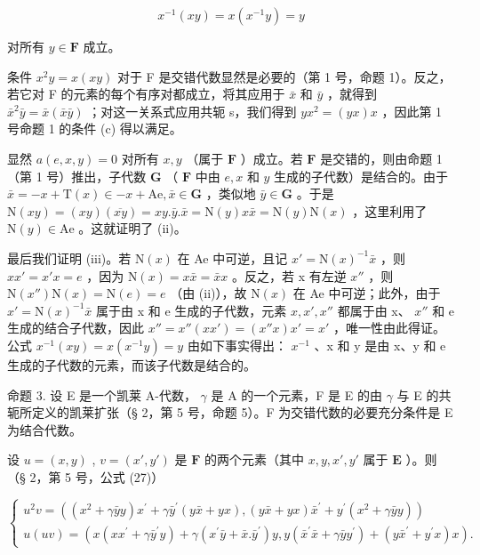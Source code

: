 \[
x ^ {- 1} (x y) = x \left(x ^ {- 1} y\right) = y
\]

对所有 \(y \in \mathbf{F}\) 成立。

条件 \(x^{2}y = x(xy)\) 对于 F 是交错代数显然是必要的（第 1 号，命题 1）。反之，若它对 F 的元素的每个有序对都成立，将其应用于 \(\bar{x}\) 和 \(\bar{y}\) ，就得到 \(\bar{x}^{2}\bar{y} = \bar{x}(\bar{x}\bar{y})\) ；对这一关系式应用共轭 s，我们得到 \(yx^{2} = (yx)x\) ，因此第 1 号命题 1 的条件 (c) 得以满足。

显然 \(a(e, x, y) = 0\) 对所有 \(x, y\) （属于 \(\mathbf{F}\) ）成立。若 \(\mathbf{F}\) 是交错的，则由命题 1（第 1 号）推出，子代数 \(\mathbf{G}\) （ \(\mathbf{F}\) 中由 \(e, x\) 和 \(y\) 生成的子代数）是结合的。由于 \(\bar{x} = -x + \mathrm{T}(x) \in -x + \mathrm{Ae}, \bar{x} \in \mathbf{G}\) ，类似地 \(\bar{y} \in \mathbf{G}\) 。于是 \(\mathrm{N}(xy) = (xy)(\overline{xy}) = xy.\bar{y}.\bar{x} = \mathrm{N}(y)x\bar{x} = \mathrm{N}(y)\mathrm{N}(x)\) ，这里利用了 \(\mathrm{N}(y) \in \mathrm{Ae}\) 。这就证明了 (ii)。

最后我们证明 (iii)。若 \(\mathrm{N}(x)\) 在 Ae 中可逆，且记 \(x' = \mathrm{N}(x)^{-1}\bar{x}\) ，则 \(xx' = x'x = e\) ，因为 \(\mathrm{N}(x) = x\bar{x} = \bar{x}x\) 。反之，若 x 有左逆 \(x''\) ，则 \(\mathrm{N}(x'')\mathrm{N}(x) = \mathrm{N}(e) = e\) （由 (ii)），故 \(\mathrm{N}(x)\) 在 Ae 中可逆；此外，由于 \(x' = \mathrm{N}(x)^{-1}\bar{x}\) 属于由 x 和 e 生成的子代数，元素 \(x, x', x''\) 都属于由 x、 \(x''\) 和 e 生成的结合子代数，因此 \(x'' = x''(xx') = (x''x)x' = x'\) ，唯一性由此得证。公式 \(x^{-1}(xy) = x(x^{-1}y) = y\) 由如下事实得出： \(x^{-1}\) 、x 和 y 是由 x、y 和 e 生成的子代数的元素，而该子代数是结合的。

命题 3. 设 E 是一个凯莱 A-代数， \(\gamma\) 是 A 的一个元素，F 是 E 的由 \(\gamma\) 与 E 的共轭所定义的凯莱扩张（§ 2，第 5 号，命题 5）。F 为交错代数的必要充分条件是 E 为结合代数。

设 \(u = (x, y)\) , \(v = (x', y')\) 是 \(\mathbf{F}\) 的两个元素（其中 \(x, y, x', y'\) 属于 \(\mathbf{E}\) ）。则（§ 2，第 5 号，公式 (27)）

\[
\left\{ \begin{array}{l} u ^ {2} v = ((x ^ {2} + \gamma \bar {y} y) x ^ {\prime} + \gamma \bar {y} ^ {\prime} (y \bar {x} + y x), (y \bar {x} + y x) \bar {x} ^ {\prime} + y ^ {\prime} (x ^ {2} + \gamma \bar {y} y)) \\ u (u v) = (x (x x ^ {\prime} + \gamma \bar {y} ^ {\prime} y) + \gamma (x ^ {\prime} \bar {y} + \bar {x}. \bar {y} ^ {\prime}) y, y (\bar {x} ^ {\prime} \bar {x} + \gamma \bar {y} y ^ {\prime}) + (y \bar {x} ^ {\prime} + y ^ {\prime} x) x). \end{array} \right.\tag{3}
\]

